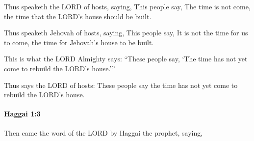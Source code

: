 			Thus speaketh the LORD of hosts, saying, This people say, The time is not come, the time that the LORD’s house should be built.

			\begin{versebox}
					\item[BHS] 
					\item[LXX] 
					\item[ASV] Thus speaketh Jehovah of hosts, saying, This people say, It is not the time for us to come, the time for Jehovah's house to be built.
					\item[NIV] This is what the LORD Almighty says: “These people say, ‘The time has not yet come to rebuild the LORD’s house.’”
					\item[NRSV] Thus says the LORD of hosts: These people say the time has not yet come to rebuild the LORD’s house.
			\end{versebox}

		\paragraph{Haggai 1:3} %
			\label{HAGGAI-1-3}

			Then came the word of the LORD by Haggai the prophet, saying,

